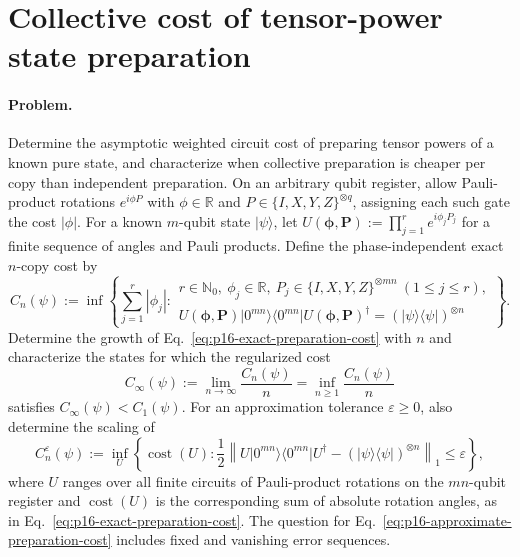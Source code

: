 \section{Collective cost of tensor-power state preparation}
\label{sec:op_56cf60cdecde44f7}

\paragraph{Problem.}
Determine the asymptotic weighted circuit cost of preparing tensor powers of a
known pure state, and characterize when collective preparation is cheaper per
copy than independent preparation.  On an arbitrary qubit register, allow
Pauli-product rotations $e^{i\phi P}$ with $\phi\in\mathbb{R}$ and
$P\in\{I,X,Y,Z\}^{\otimes q}$, assigning each such gate the cost $|\phi|$.
For a known $m$-qubit state $\lvert\psi\rangle$, let
$U(\boldsymbol\phi,\boldsymbol P):=\prod_{j=1}^r e^{i\phi_jP_j}$ for a finite
sequence of angles and Pauli products.  Define the phase-independent exact
$n$-copy cost by
\begin{equation}
  C_n(\psi)
  :=\inf\left\{
    \sum_{j=1}^{r}|\phi_j|:
    \begin{array}{l}
      r\in\mathbb N_0,\ \phi_j\in\mathbb R,\ 
      P_j\in\{I,X,Y,Z\}^{\otimes mn}\ (1\le j\le r),\\
      U(\boldsymbol\phi,\boldsymbol P)
      \lvert0^{mn}\rangle\!\langle0^{mn}\rvert
      U(\boldsymbol\phi,\boldsymbol P)^\dagger
      =(\lvert\psi\rangle\!\langle\psi\rvert)^{\otimes n}
    \end{array}
  \right\}.
  \label{eq:p16-exact-preparation-cost}
\end{equation}
Determine the growth of Eq.~\eqref{eq:p16-exact-preparation-cost} with $n$
and characterize the states for which the regularized cost
\begin{equation}
  C_\infty(\psi)
  :=\lim_{n\to\infty}\frac{C_n(\psi)}{n}
  =\inf_{n\ge1}\frac{C_n(\psi)}{n}
  \label{eq:p16-regularized-cost}
\end{equation}
satisfies $C_\infty(\psi)<C_1(\psi)$.  For an approximation tolerance
$\varepsilon\ge0$, also determine the scaling of
\begin{equation}
  C_n^\varepsilon(\psi)
  :=\inf_U\left\{
    \operatorname{cost}(U):
    \frac12\left\|
      U\lvert0^{mn}\rangle\!\langle0^{mn}\rvert U^\dagger
      -(\lvert\psi\rangle\!\langle\psi\rvert)^{\otimes n}
    \right\|_1\le\varepsilon
  \right\},
  \label{eq:p16-approximate-preparation-cost}
\end{equation}
where $U$ ranges over all finite circuits of Pauli-product rotations on the
$mn$-qubit register and $\operatorname{cost}(U)$ is the corresponding sum of
absolute rotation angles, as in
Eq.~\eqref{eq:p16-exact-preparation-cost}.  The question for
Eq.~\eqref{eq:p16-approximate-preparation-cost} includes fixed and vanishing
error sequences.

